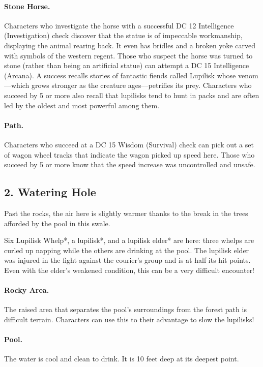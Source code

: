 \documentclass[10pt,a4paper,twoside,twocolumn,openany,bg=print,nodeprecatedcode]{dndbook}
\begin{document}
\paragraph{Stone Horse.}
Characters who investigate the horse with a successful DC 12 Intelligence (Investigation) check discover that the statue is of impeccable workmanship, displaying the animal rearing back. It even has bridles and a broken yoke carved with symbols of the western regent. Those who suspect the horse was turned to stone (rather than being an artificial statue) can attempt a DC 15 Intelligence (Arcana). A success recalls stories of fantastic fiends called Lupilisk whose venom—which grows stronger as the creature ages—petrifies its prey. Characters who succeed by 5 or more also recall that lupilisks tend to hunt in packs and are often led by the oldest and most powerful among them.
\paragraph{Path.}
Characters who succeed at a DC 15 Wisdom (Survival) check can pick out a set of wagon wheel tracks that indicate the wagon picked up speed here. Those who succeed by 5 or more know that the speed increase was uncontrolled and unsafe.
\subsection{2. Watering Hole}
\begin{DndReadAloud}{}
Past the rocks, the air here is slightly warmer thanks to the break in the trees afforded by the pool in this swale.
\end{DndReadAloud}

Six Lupilisk Whelp*, a lupilisk*, and a lupilisk elder* are here: three whelps are curled up napping while the others are drinking at the pool. The lupilisk elder was injured in the fight against the courier's group and is at half its hit points. Even with the elder's weakened condition, this can be a very difficult encounter!
\paragraph{Rocky Area.}
The raised area that separates the pool's surroundings from the forest path is difficult terrain. Characters can use this to their advantage to slow the lupilisks!
\paragraph{Pool.}
The water is cool and clean to drink. It is 10 feet deep at its deepest point.
\end{document}
